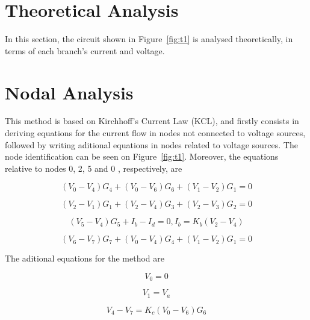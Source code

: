 \section{Theoretical Analysis}
\label{sec:analysis}

In this section, the circuit shown in Figure~\ref{fig:t1} is analysed
theoretically, in terms of each branch's current and voltage.

\section{Nodal Analysis}

This method is based on Kirchhoff's Current Law (KCL), and firstly consists in
deriving equations for the current flow in nodes not connected to voltage sources,
followed by writing aditional equations in nodes related to voltage sources. The node 
identification can be seen on Figure~\ref{fig:t1}. Moreover, the equations relative to
nodes 0, 2, 5 and 0 , respectively, are

\begin{equation}
  (V_0 - V_4)G_4 + (V_0 - V_6)G_6 + (V_1 - V_2)G_1 = 0 
  \label{eq:kvl}
\end{equation}

\begin{equation}
  (V_2 - V_1)G_1 + (V_2 - V_4)G_3 + (V_2 - V_3)G_2 = 0 
  \label{eq:kvl2}
\end{equation}

\begin{equation}
  (V_5 - V_4)G_5 + I_b - I_d = 0 , I_b = K_b(V_2 - V_4) 
  \label{eq:kvl3}
\end{equation}

\begin{equation}
  (V_6 - V_7)G_7 + (V_0 - V_4)G_4 + (V_1 - V_2)G_1 = 0 
  \label{eq:kvl4}
\end{equation}

The aditional equations for the method are

\begin{equation}
  V_0 = 0
  \label{eq:kvl5}
\end{equation}

\begin{equation}
  V_1 = V_a
  \label{eq:kvl6}
\end{equation}

\begin{equation}
  V_4 - V_7 = K_c(V_0 - V_6)G_6
  \label{eq:kvl7}
\end{equation}

